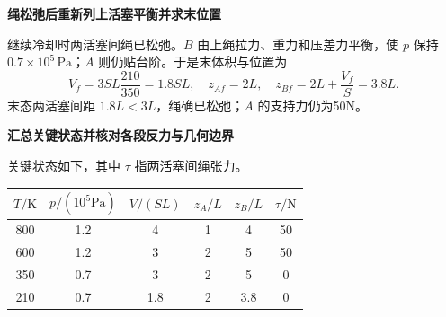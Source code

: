 \begin{solution}
\par\medskip{}\noindent\textbf{绳松弛后重新列上活塞平衡并求末位置}\par\nobreak
继续冷却时两活塞间绳已松弛。$B$ 由上绳拉力、重力和压差力平衡，使 $p$ 保持 $0.7\times10^5\,\mathrm{Pa}$；$A$ 则仍贴台阶。于是末体积与位置为
\[\boxed{V_f=3SL\frac{210}{350}=1.8SL,\quad z_{Af}=2L,\quad z_{Bf}=2L+\frac{V_f}{S}=3.8L}.\]
末态两活塞间距 $1.8L<3L$，绳确已松弛；$A$ 的支持力仍为50N。


\par\medskip{}\noindent\textbf{汇总关键状态并核对各段反力与几何边界}\par\nobreak
关键状态如下，其中 $\tau$ 指两活塞间绳张力。
\begin{center}\small\begin{tabular}{cccccc}\toprule $T/\mathrm K$&$p/(10^5\mathrm{Pa})$&$V/(SL)$&$z_A/L$&$z_B/L$&$\tau/\mathrm N$\\\midrule800&1.2&4&1&4&50\\600&1.2&3&2&5&50\\350&0.7&3&2&5&0\\210&0.7&1.8&2&3.8&0\\\bottomrule\end{tabular}\end{center}

\end{solution}
